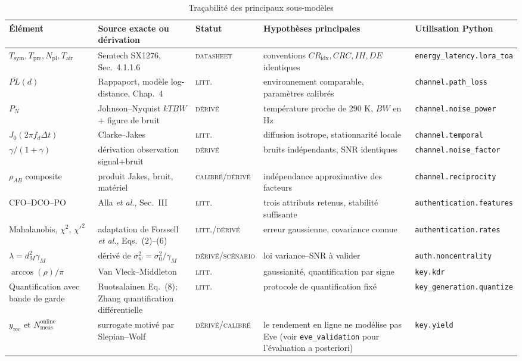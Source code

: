 \documentclass[conference,a4paper]{IEEEtran}
\newcommand{\statusData}{\textsc{datasheet}}
\newcommand{\statusLit}{\textsc{litt.}}
\newcommand{\statusDer}{\textsc{dérivé}}
\newcommand{\statusScen}{\textsc{scénario}}
\newcommand{\statusCal}{\textsc{calibré}}
\newcommand{\ToA}{T_{\mathrm{air}}}
\begin{document}
\begin{table}[H]
\caption{Traçabilité des principaux sous-modèles}
\label{tab:traceability-main}
\centering\scriptsize
\begin{tabularx}{\textwidth}{@{}l Y Y Y Y@{}}
\toprule
Élément & Source exacte ou dérivation & Statut & Hypothèses principales & Utilisation Python \\
\midrule
$T_{\mathrm{sym}},T_{\mathrm{pre}},N_{\mathrm{pl}},\ToA$ & Semtech SX1276, Sec.~4.1.1.6 & \statusData{} & conventions $CR_{\mathrm{idx}},CRC,IH,DE$ identiques & \texttt{energy\_latency.lora\_toa} \\
$\overline{PL}(d)$ & Rappaport, modèle log-distance, Chap.~4 & \statusLit{} & environnement comparable, paramètres calibrés & \texttt{channel.path\_loss} \\
$P_N$ & Johnson--Nyquist $kTBW$ + figure de bruit & \statusDer{} & température proche de 290 K, $BW$ en Hz & \texttt{channel.noise\_power} \\
$J_0(2\pi f_d\Delta t)$ & Clarke--Jakes & \statusLit{} & diffusion isotrope, stationnarité locale & \texttt{channel.temporal} \\
$\gamma/(1+\gamma)$ & dérivation observation signal+bruit & \statusDer{} & bruits indépendants, SNR identiques & \texttt{channel.noise\_factor} \\
$\rho_{AB}$ composite & produit Jakes, bruit, matériel & \statusCal{}/\statusDer{} & indépendance approximative des facteurs & \texttt{channel.reciprocity} \\
CFO--DCO--PO & Alla \emph{et al.}, Sec.~III & \statusLit{} & trois attributs retenus, stabilité suffisante & \texttt{authentication.features} \\
Mahalanobis, $\chi^2$, $\chi'^2$ & adaptation de Forssell \emph{et al.}, Eqs.~(2)--(6) & \statusLit{}/\statusDer{} & erreur gaussienne, covariance connue & \texttt{authentication.rates} \\
$\lambda=d_M^2\gamma_M$ & dérivé de $\sigma_w^2=\sigma_0^2/\gamma_M$ & \statusDer{}/\statusScen{} & loi variance--SNR à valider & \texttt{auth.noncentrality} \\
$\arccos(\rho)/\pi$ & Van Vleck--Middleton & \statusLit{} & gaussianité, quantification par signe & \texttt{key.kdr} \\
Quantification avec bande de garde & Ruotsalainen Eq.~(8); Zhang quantification différentielle & \statusLit{} & protocole de quantification fixé & \texttt{key\_generation.quantize} \\
$y_{\mathrm{rec}}$ et $N_{\mathrm{meas}}^{\mathrm{online}}$ & surrogate motivé par Slepian--Wolf & \statusDer{}/\statusCal{} & le rendement en ligne ne modélise pas Eve (voir \texttt{eve\_validation} pour l'évaluation a posteriori) & \texttt{key.yield} \\

\end{tabularx}
\end{table}
\end{document}
